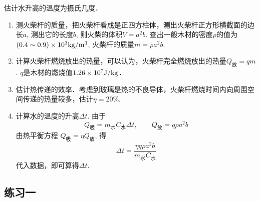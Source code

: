 估计水升高的温度为摄氏几度．

\begin{enumerate}
    \item 测火柴杆的质量，把火柴杆看成是正四方柱体，测出火柴杆正方形横截面的边长$a$, 测出它的长度$b$, 则火柴的体积$V=a^2b$. 查出一般木材的密度$\rho$的值为$(0.4\sim 0.9)\times10^3{\rm kg/m^3}$, 火柴杆的质量$m=\rho a^2b$.
    \item 计算火柴杆燃烧放出的热量，可以认为，火柴杆完全燃烧放出的热量$Q_{\text{放}}=qm$. $q$是木材的燃烧值$1.26\times10^7{\rm J/kg}$．
    \item 估计热传递的效率．考虑到玻璃是热的不良导体，火柴杆燃烧时间内向周围空间传递的热量较多，估计$\eta=20\%$.
    \item 计算水的温度的升高$\Delta t$. 由于
    \[Q_{\text{吸}}=m_{\text{水}}C_{\text{水}}\Delta t,\qquad Q_{\text{放}}=q\rho a^2b\]
    由热平衡方程 $Q_{\text{吸}}=\eta Q_{\text{放}}$, 得
    \[\Delta t=\frac{\eta q\rho a^2b}{m_{\text{水}}C_{\text{水}}}\]
    代入数据，即可算得$\Delta t$.
\end{enumerate}


\subsection{练习一}


